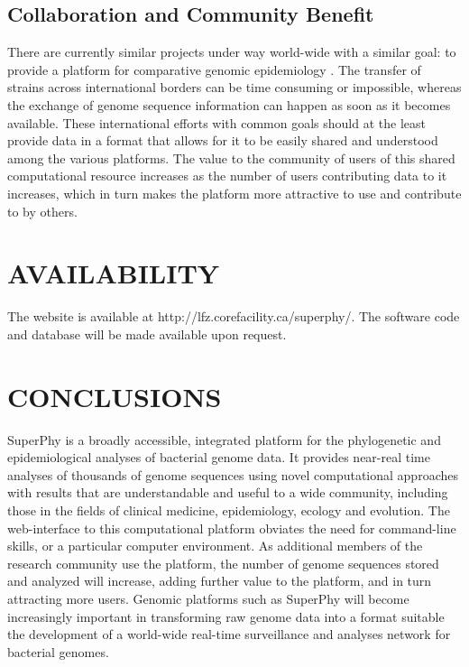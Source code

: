 \documentclass[a4paper,twoside]{article}
\begin{document}
\subsection{Collaboration and Community Benefit}
\label{sec:collaboration}
There are currently similar projects under way world-wide with a similar goal: to provide a platform for comparative genomic epidemiology \cite{kupferschmidt_outbreak_2011}. The transfer of strains across international borders can be time consuming or impossible, whereas the exchange of genome sequence information can happen as soon as it becomes available. These international efforts with common goals should at the least provide data in a format that allows for it to be easily shared and understood among the various platforms. The value to the community of users of this shared computational resource increases as the number of users contributing data to it increases, which in turn makes the platform more attractive to use and contribute to by others.

\section{\uppercase{Availability}}
\label{sec:availability}

The website is available at http://lfz.corefacility.ca/superphy/. The software code and database will be made available upon request.

\section{\uppercase{Conclusions}}
\label{sec:conclusion}

\noindent SuperPhy is a broadly accessible, integrated platform for the phylogenetic and epidemiological analyses of bacterial genome data. It provides near-real time analyses of thousands of genome sequences using novel computational approaches with results that are understandable and useful to a wide community, including those in the fields of clinical medicine, epidemiology, ecology and evolution. The web-interface to this computational platform obviates the need for command-line skills, or a particular computer environment. As additional members of the research community use the platform, the number of genome sequences stored and analyzed will increase, adding further value to the platform, and in turn attracting more users. Genomic platforms such as SuperPhy will become increasingly important in transforming raw genome data into a format suitable the development of a world-wide real-time surveillance and analyses network for bacterial genomes.

\vfill

{\small
}

\vfill
\end{document}
